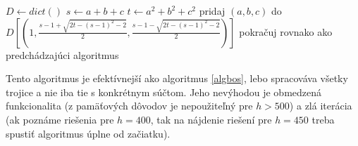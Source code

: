 \begin{algorithmic}
\STATE $D \gets dict()$
			\STATE $s \gets a+b+c$
			\STATE $t \gets a^2+b^2+c^2$
				\STATE pridaj $(a,b,c)$ do $D[(1, \frac{s-1 + \sqrt{2t - (s-1)^2 - 2}}{2}, \frac{s-1 - \sqrt{2t - (s-1)^2 - 2}}{2})]$
			\ENDIF
		\ENDFOR
	\ENDFOR
\ENDFOR
\STATE pokračuj rovnako ako predchádzajúci algoritmus
\end{algorithmic}

Tento algoritmus je efektívnejší ako algoritmus \ref{algbos}, lebo spracováva všetky trojice a nie iba tie s konkrétnym súčtom. Jeho nevýhodou je obmedzená funkcionalita (z pamäťových dôvodov je nepoužiteľný pre $h > 500$) a zlá iterácia (ak poznáme riešenia pre $h = 400$, tak na nájdenie riešení pre $h = 450$ treba spustiť algoritmus úplne od začiatku).




